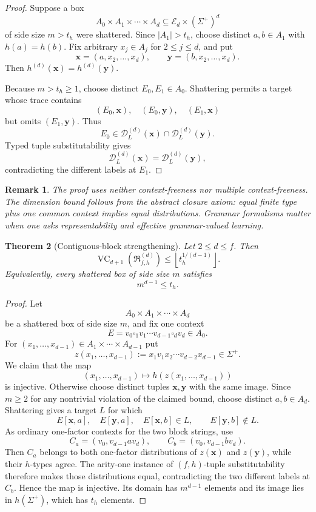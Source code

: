 \documentclass[11pt]{article}
\newtheorem{theorem}{Theorem}[section]
\newtheorem{remark}[theorem]{Remark}
\newcommand{\D}{\mathcal D}
\newcommand{\E}{\mathcal E}
\newcommand{\Rclass}{\mathfrak R}
\newcommand{\VC}{\operatorname{VC}}
\newcommand{\blank}{\square}
\begin{document}
\begin{proof}
Suppose a box
\[
A_0\times A_1\times\cdots\times A_d
\subseteq \E_d\times(\Sigma^+)^d
\]
of side size \(m>t_h\) were shattered. Since \(|A_1|>t_h\), choose distinct
\(a,b\in A_1\) with \(h(a)=h(b)\). Fix arbitrary \(x_j\in A_j\) for
\(2\le j\le d\), and put
\[
\mathbf x=(a,x_2,\ldots,x_d),\qquad
\mathbf y=(b,x_2,\ldots,x_d).
\]
Then \(h^{(d)}(\mathbf x)=h^{(d)}(\mathbf y)\).

Because \(m>t_h\ge1\), choose distinct \(E_0,E_1\in A_0\). Shattering
permits a target whose trace contains
\[
(E_0,\mathbf x),\quad(E_0,\mathbf y),\quad(E_1,\mathbf x)
\]
but omits \((E_1,\mathbf y)\). Thus
\[
E_0\in\D_L^{(d)}(\mathbf x)\cap\D_L^{(d)}(\mathbf y).
\]
Typed tuple substitutability gives
\[
\D_L^{(d)}(\mathbf x)=\D_L^{(d)}(\mathbf y),
\]
contradicting the different labels at \(E_1\).
\end{proof}

\begin{remark}
The proof uses neither context-freeness nor multiple context-freeness.
The dimension bound follows from the abstract closure axiom:
equal finite type plus one common context implies equal distributions.
Grammar formalisms matter when one asks representability and effective
grammar-valued learning.
\end{remark}

\begin{theorem}[Contiguous-block strengthening]\label{thm:block-bound}
Let \(2\le d\le f\). Then
\[
  \VC_{d+1}\!\left(\Rclass_{f,h}^{(d)}\right)
  \le \left\lfloor t_h^{1/(d-1)}\right\rfloor.
\]
Equivalently, every shattered box of side size \(m\) satisfies
\[
  m^{d-1}\le t_h.
\]
\end{theorem}

\begin{proof}
Let
\[
A_0\times A_1\times\cdots\times A_d
\]
be a shattered box of side size \(m\), and fix one context
\[
E=v_0\blank_1v_1\cdots v_{d-1}\blank_dv_d\in A_0.
\]
For \((x_1,\ldots,x_{d-1})\in A_1\times\cdots\times A_{d-1}\) put
\[
z(x_1,\ldots,x_{d-1})
:=x_1v_1x_2\cdots v_{d-2}x_{d-1}\in\Sigma^+.
\]
We claim that the map
\[
(x_1,\ldots,x_{d-1})\longmapsto h(z(x_1,\ldots,x_{d-1}))
\]
is injective. Otherwise choose distinct tuples \(\mathbf x,\mathbf y\) with the
same image. Since \(m\ge2\) for any nontrivial violation of the claimed
bound, choose distinct \(a,b\in A_d\). Shattering gives a target \(L\) for which
\[
E[\mathbf x,a],\quad E[\mathbf y,a],\quad E[\mathbf x,b]\in L,
\qquad E[\mathbf y,b]\notin L.
\]
As ordinary one-factor contexts for the two block strings, use
\[
C_a=(v_0,v_{d-1}av_d),\qquad
C_b=(v_0,v_{d-1}bv_d).
\]
Then \(C_a\) belongs to both one-factor distributions of
\(z(\mathbf x)\) and \(z(\mathbf y)\), while their \(h\)-types agree. The arity-one
instance of \((f,h)\)-tuple substitutability therefore makes those distributions
equal, contradicting the two different labels at \(C_b\). Hence the map is
injective. Its domain has \(m^{d-1}\) elements and its image lies in
\(h(\Sigma^+)\), which has \(t_h\) elements.
\end{proof}
\end{document}
